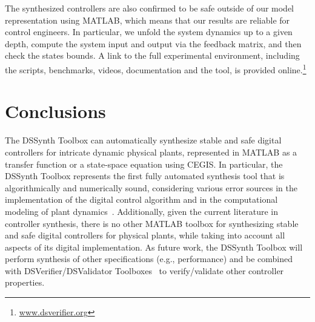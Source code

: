 \documentclass[10pt,conference]{IEEEtran}
\newcommand\tool{{DSSynth Toolbox}\xspace}
\begin{document}
The synthesized controllers are also confirmed to be safe outside of our model
representation using MATLAB, which means that our results are reliable for control engineers. 
In particular, we unfold the system dynamics up to a given depth, 
compute the system input and output via the feedback matrix, and then check the states bounds.
 A link to the full experimental environment, including the scripts, benchmarks, 
 videos, documentation and the tool, is provided online.\footnote{\url{www.dsverifier.org}}

\section{Conclusions}

The \tool can automatically synthesize stable and safe digital controllers for intricate dynamic physical plants, 
represented in MATLAB as a transfer function or a state-space equation using CEGIS. 
In particular, the \tool represents the first fully automated synthesis
tool that is algorithmically and numerically sound, considering various error
sources in the implementation of the digital control algorithm and in the computational 
modeling of plant dynamics~\cite{abate2017,abatecav2017}.
%
Additionally, given the current literature in controller synthesis, there is no other MATLAB toolbox 
for synthesizing stable and safe digital controllers for physical plants, while taking into account all aspects of its 
digital implementation. 
%
As future work, the \tool will perform synthesis of other specifications (e.g., performance) 
and be combined with DSVerifier/DSValidator Toolboxes~\cite{issta2017,dsvalidator} to verify/validate 
other controller properties. 


 
\end{document}
